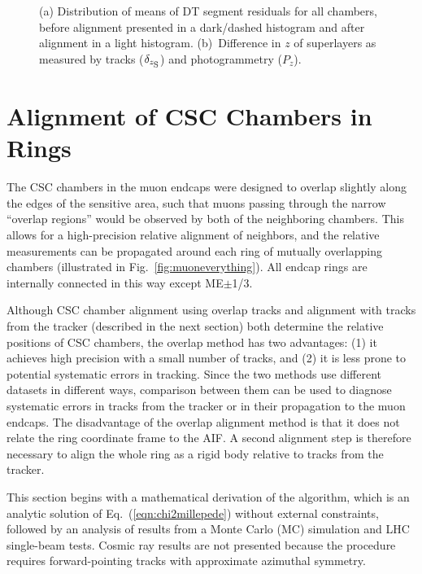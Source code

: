 \documentclass[11pt,twoside,a4paper,cmspaper]{cms-tdr}
\begin{document}
\begin{figure}
\centering
{}
\caption{(a) Distribution of means of DT segment residuals for all
chambers, before alignment presented in a dark/dashed histogram and
after alignment in a light histogram.  (b)~Difference in $z$ of
superlayers as measured by tracks ($\delta_{z_{\mbox{\scriptsize
S}}}$) and photogrammetry ($P_z$).}
\end{figure}

\section{Alignment of CSC Chambers in Rings}
\label{sec:localcsc}

The CSC chambers in the muon endcaps were designed to overlap slightly
along the edges of the sensitive area, such that muons passing through
the narrow ``overlap regions'' would be observed by both of the
neighboring chambers.  This allows for a high-precision relative
alignment of neighbors, and the relative measurements can be propagated
around each ring of mutually overlapping chambers (illustrated in
Fig.~\ref{fig:muoneverything}).  All endcap rings are internally
connected in this way except ME$\pm$1/3.

Although CSC chamber alignment using overlap tracks and alignment with tracks from the tracker (described
in the next section) both determine the relative positions of CSC
chambers, the overlap method has two advantages: (1) it achieves high
precision with a small number of tracks, and (2) it is less prone to
potential systematic errors in tracking.  Since the two methods use
different datasets in different ways, comparison between them can be
used to diagnose systematic errors in tracks from the tracker or in their propagation
to the muon endcaps.  The disadvantage of the overlap alignment method
is that it does not relate the ring coordinate frame to the AIF.  A
second alignment step is therefore necessary to align the whole ring
as a rigid body relative to tracks from the tracker.

This section begins with a mathematical derivation of the algorithm,
which is an analytic solution of Eq.~(\ref{eqn:chi2millepede}) without
external constraints, followed by an analysis of results from a Monte
Carlo (MC) simulation and LHC single-beam tests.  Cosmic ray results
are not presented because the procedure requires forward-pointing
tracks with approximate azimuthal symmetry.
\end{document}
